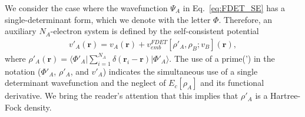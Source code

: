 \documentclass[journal=jctcce,manuscript=article]{achemso}
\newcommand{\nr}[1]{\color{red}#1\color{black}}
\begin{document}
\nr{We consider the case where the wavefunction $\Psi_A$ in Eq.~\ref{eq:FDET_SE} has a single-determinant form, which we denote with the letter $\Phi$. Therefore, an auxiliary $N_A$-electron system is defined by the self-consistent potential
\begin{eqnarray}
v'_A(\mathbf{r})=v_A(\mathbf{r})+v_{emb}^{{FDET}}[\rho'_A,\rho_B; v_B](\mathbf{r})\label{eq:def_v'},
\end{eqnarray}
where $\rho'_A(\mathbf{r})=\langle\Phi'_A\vert\sum_{i=1}^{N_{A}}\delta(\mathbf{r}_i-\mathbf{r})\vert\Phi'_A\rangle$. The use of a prime(') in the notation ($\Phi'_A$, $\rho'_A$, and $v'_A$) indicates the simultaneous use of a single determinant wavefunction and the neglect of $E_c[\rho_A]$ and its functional derivative. We bring the reader's attention that this implies that $\rho'_A$ is a Hartree-Fock density.}
\end{document}
